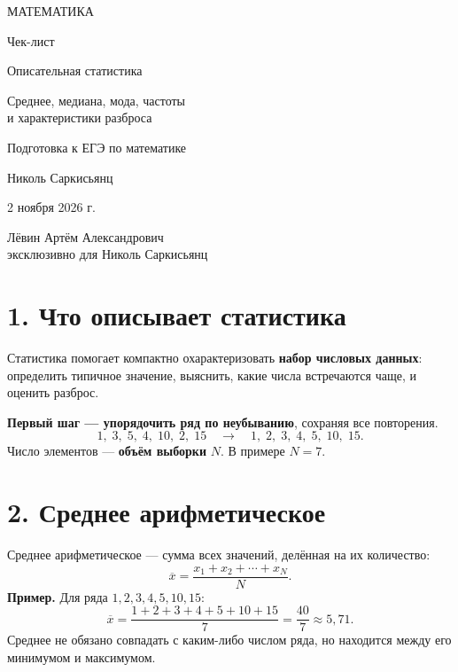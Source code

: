 \documentclass[a4paper,12pt]{article}
\newcommand{\key}[1]{\textcolor{darkaccent}{\textbf{#1}}}
\newcommand{\mysection}[1]{\vspace{5pt}\section*{\textcolor{darkaccent}{#1}}\vspace{-5pt}}
\newcommand{\myexample}[1]{\textbf{Пример.} #1}
\newcommand{\xbar}{\overline{x}}
\begin{document}
\thispagestyle{empty}
\begin{center}
\vspace*{27mm}
{\large\color{darkaccent}\MakeUppercase{Математика}}\par
\vspace{24mm}
{\fontsize{24}{29}\selectfont Чек-лист}\par
\vspace{18mm}
{\fontsize{21}{27}\selectfont\color{accent} Описательная статистика}\par
\vspace{6mm}
{\fontsize{15}{22}\selectfont Среднее, медиана, мода, частоты\\ и характеристики разброса}\par
\vspace{19mm}
{\normalsize Подготовка к ЕГЭ по математике}\par
\vfill
{\large Николь Саркисьянц}\par
\vspace{12mm}
{\normalsize 2 ноября 2026 г.}\par
\vspace{17mm}
{\small Лёвин Артём Александрович\\эксклюзивно для Николь Саркисьянц}\par
\vspace{19mm}
\end{center}
\clearpage

\mysection{1. Что описывает статистика}
Статистика помогает компактно охарактеризовать \key{набор числовых данных}: определить типичное значение, выяснить, какие числа встречаются чаще, и оценить разброс.

\key{Первый шаг --- упорядочить ряд по неубыванию}, сохраняя все повторения.
\[
1,\;3,\;5,\;4,\;10,\;2,\;15
\quad\longrightarrow\quad
1,\;2,\;3,\;4,\;5,\;10,\;15.
\]
Число элементов --- \key{объём выборки} $N$. В примере $N=7$.

\mysection{2. Среднее арифметическое}
Среднее арифметическое --- сумма всех значений, делённая на их количество:
\[
\boxed{\displaystyle \xbar=\frac{x_1+x_2+\cdots+x_N}{N}.}
\]
\myexample{Для ряда $1,2,3,4,5,10,15$:}
\[
\xbar=\frac{1+2+3+4+5+10+15}{7}=\frac{40}{7}\approx5{,}71.
\]
Среднее не обязано совпадать с каким-либо числом ряда, но находится между его минимумом и максимумом.
\end{document}
